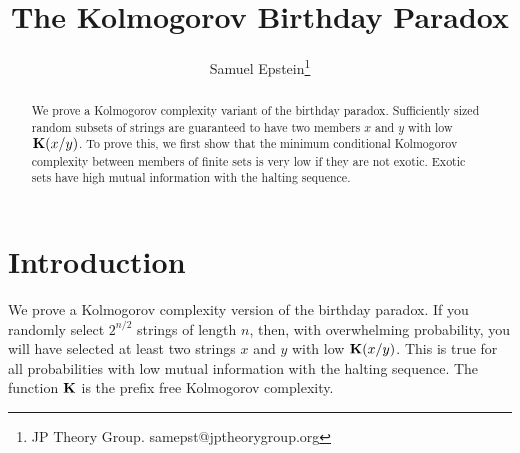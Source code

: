 \documentclass[11pt]{article}\textwidth 6.5in\textheight 9in
\begin{document}
\newcommand\w{{\mathbf w}}
\newcommand\Ks{\mathbf{Ks}} \newcommand\q{{\mathbf q}}
\newcommand\E{{\mathbf E}} \newcommand\St{{\mathbf S}}
\newcommand\M{{\mathbf M}}\newcommand\Q{{\mathbf Q}}
\newcommand\ch{{\mathcal H}} \renewcommand\l{\tau}
\newcommand\tb{{\mathbf t}} \renewcommand\L{{\mathbf L}}
\newcommand\bb{{\mathbf {bb}}}\newcommand\Km{{\mathbf {Km}}}
\renewcommand\q{{\mathbf q}}\newcommand\J{{\mathbf J}}
\newcommand\z{\mathbf{z}}

\newcommand\B{\mathbf{bb}}\newcommand\f{\mathbf{f}}
\newcommand\hd{\mathbf{0'}} \newcommand\T{{\mathbf T}}
\newcommand\R{\mathbb{R}}\renewcommand\Q{\mathbb{Q}}
\newcommand\N{\mathbb{N}}\newcommand\BT{\{0,1\}}
\newcommand\FS{\BT^*}\newcommand\IS{\BT^\infty}
\newcommand\FIS{\BT^{*\infty}}\newcommand\C{\mathcal{L}}
\renewcommand\S{\mathcal{C}}\newcommand\ST{\mathcal{S}}
\newcommand\UM{\nu_0}\newcommand\EN{\mathcal{W}}

\newcommand{\supp}{\mathrm{Supp}}

\newcommand\lenum{\lbrack\!\lbrack}
\newcommand\renum{\rbrack\!\rbrack}
\renewcommand\i{\mathbf{i}}
\renewcommand\qed{\hfill\emm\square}

\title{\vspace*{-3pc} The Kolmogorov Birthday Paradox}

\author {Samuel Epstein\footnote{JP Theory Group. samepst@jptheorygroup.org}}

\maketitle

\renewcommand{\contentsname}{\centering Contents}
\begin{abstract}
We prove a Kolmogorov complexity variant of the birthday paradox. Sufficiently sized random subsets of strings are guaranteed to have two members $x$ and $y$ with low ${\mathbf K}(x/y)$. To prove this, we first show that the minimum conditional Kolmogorov complexity between members of finite sets is very low if they are not exotic. Exotic sets have high mutual information with the halting sequence.
\end{abstract}


\section{Introduction}
We prove a Kolmogorov complexity version of the birthday paradox. If you randomly  select $2^{n/2}$ strings of length $n$, then, with overwhelming probability, you will have selected at least two strings $x$ and $y$ with low ${\mathbf K}(x/y)$. This is true for all probabilities with low mutual information with the halting sequence. The function ${\mathbf K}$ is the prefix free Kolmogorov complexity.
\end{document}
